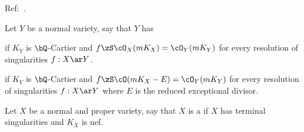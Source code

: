 \documentclass[article, a4paper, twoside]{universal}
\begin{document}
\confighead{}{}{}



Ref:~\cite{KM1998Birational,Kollar2013,Xu2025}.

\begin{dfn}[2.11, 2.12]
	Let $Y$ be a normal variety, say that $Y$ has
	\begin{itm}
		\item {} if $K_{Y}$ is $\bQ$-Cartier and $f\zS\cO_{X}(mK_{X})=\cO_{Y}(mK_{Y})$ for every resolution of singularities $f:X\ar Y$.
		\item {} if $K_{Y}$ is $\bQ$-Cartier and $f\zS\cO(mK_{X}-E)=\cO_{Y}(mK_{Y})$ for every resolution of singularities $f:X\ar Y$ where $E$ is the reduced exceptional divisor.
	\end{itm}
\end{dfn}

\begin{dfn}[2.13]
	Let $X$ be a normal and proper variety, say that $X$ is a  if $X$ has terminal singularities and $K_{X}$ is nef.
\end{dfn}
\end{document}

